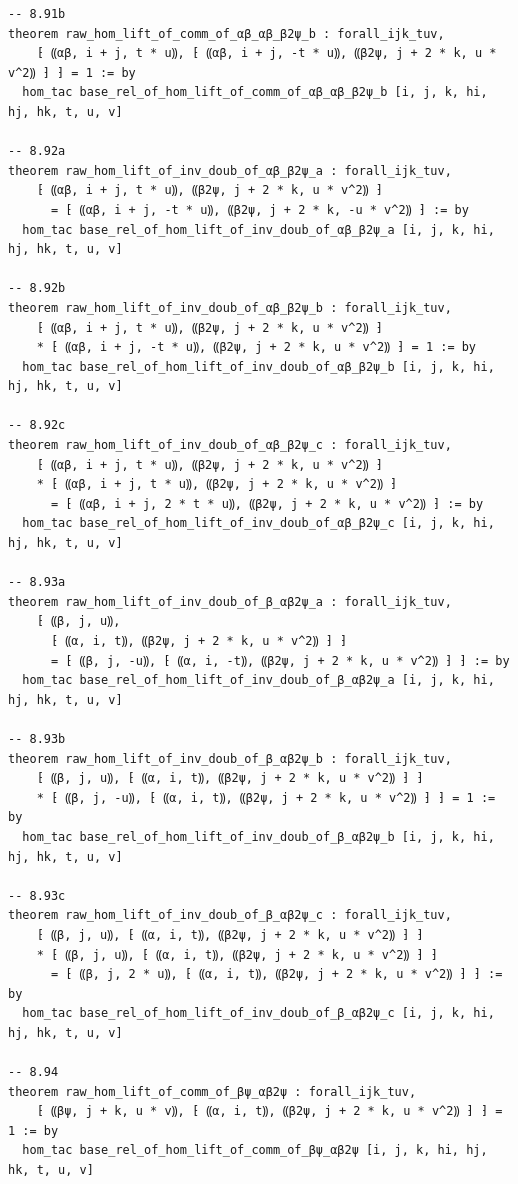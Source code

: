 \documentclass[10pt,a4paper]{article}
\begin{document}
\begin{Verbatim}
-- 8.91b
theorem raw_hom_lift_of_comm_of_αβ_αβ_β2ψ_b : forall_ijk_tuv,
    ⁅ ⸨αβ, i + j, t * u⸩, ⁅ ⸨αβ, i + j, -t * u⸩, ⸨β2ψ, j + 2 * k, u * v^2⸩ ⁆ ⁆ = 1 := by
  hom_tac base_rel_of_hom_lift_of_comm_of_αβ_αβ_β2ψ_b [i, j, k, hi, hj, hk, t, u, v]

-- 8.92a
theorem raw_hom_lift_of_inv_doub_of_αβ_β2ψ_a : forall_ijk_tuv,
    ⁅ ⸨αβ, i + j, t * u⸩, ⸨β2ψ, j + 2 * k, u * v^2⸩ ⁆
      = ⁅ ⸨αβ, i + j, -t * u⸩, ⸨β2ψ, j + 2 * k, -u * v^2⸩ ⁆ := by
  hom_tac base_rel_of_hom_lift_of_inv_doub_of_αβ_β2ψ_a [i, j, k, hi, hj, hk, t, u, v]

-- 8.92b
theorem raw_hom_lift_of_inv_doub_of_αβ_β2ψ_b : forall_ijk_tuv,
    ⁅ ⸨αβ, i + j, t * u⸩, ⸨β2ψ, j + 2 * k, u * v^2⸩ ⁆
    * ⁅ ⸨αβ, i + j, -t * u⸩, ⸨β2ψ, j + 2 * k, u * v^2⸩ ⁆ = 1 := by
  hom_tac base_rel_of_hom_lift_of_inv_doub_of_αβ_β2ψ_b [i, j, k, hi, hj, hk, t, u, v]

-- 8.92c
theorem raw_hom_lift_of_inv_doub_of_αβ_β2ψ_c : forall_ijk_tuv,
    ⁅ ⸨αβ, i + j, t * u⸩, ⸨β2ψ, j + 2 * k, u * v^2⸩ ⁆
    * ⁅ ⸨αβ, i + j, t * u⸩, ⸨β2ψ, j + 2 * k, u * v^2⸩ ⁆
      = ⁅ ⸨αβ, i + j, 2 * t * u⸩, ⸨β2ψ, j + 2 * k, u * v^2⸩ ⁆ := by
  hom_tac base_rel_of_hom_lift_of_inv_doub_of_αβ_β2ψ_c [i, j, k, hi, hj, hk, t, u, v]

-- 8.93a
theorem raw_hom_lift_of_inv_doub_of_β_αβ2ψ_a : forall_ijk_tuv,
    ⁅ ⸨β, j, u⸩,
      ⁅ ⸨α, i, t⸩, ⸨β2ψ, j + 2 * k, u * v^2⸩ ⁆ ⁆
      = ⁅ ⸨β, j, -u⸩, ⁅ ⸨α, i, -t⸩, ⸨β2ψ, j + 2 * k, u * v^2⸩ ⁆ ⁆ := by
  hom_tac base_rel_of_hom_lift_of_inv_doub_of_β_αβ2ψ_a [i, j, k, hi, hj, hk, t, u, v]

-- 8.93b
theorem raw_hom_lift_of_inv_doub_of_β_αβ2ψ_b : forall_ijk_tuv,
    ⁅ ⸨β, j, u⸩, ⁅ ⸨α, i, t⸩, ⸨β2ψ, j + 2 * k, u * v^2⸩ ⁆ ⁆
    * ⁅ ⸨β, j, -u⸩, ⁅ ⸨α, i, t⸩, ⸨β2ψ, j + 2 * k, u * v^2⸩ ⁆ ⁆ = 1 := by
  hom_tac base_rel_of_hom_lift_of_inv_doub_of_β_αβ2ψ_b [i, j, k, hi, hj, hk, t, u, v]

-- 8.93c
theorem raw_hom_lift_of_inv_doub_of_β_αβ2ψ_c : forall_ijk_tuv,
    ⁅ ⸨β, j, u⸩, ⁅ ⸨α, i, t⸩, ⸨β2ψ, j + 2 * k, u * v^2⸩ ⁆ ⁆
    * ⁅ ⸨β, j, u⸩, ⁅ ⸨α, i, t⸩, ⸨β2ψ, j + 2 * k, u * v^2⸩ ⁆ ⁆
      = ⁅ ⸨β, j, 2 * u⸩, ⁅ ⸨α, i, t⸩, ⸨β2ψ, j + 2 * k, u * v^2⸩ ⁆ ⁆ := by
  hom_tac base_rel_of_hom_lift_of_inv_doub_of_β_αβ2ψ_c [i, j, k, hi, hj, hk, t, u, v]

-- 8.94
theorem raw_hom_lift_of_comm_of_βψ_αβ2ψ : forall_ijk_tuv,
    ⁅ ⸨βψ, j + k, u * v⸩, ⁅ ⸨α, i, t⸩, ⸨β2ψ, j + 2 * k, u * v^2⸩ ⁆ ⁆ = 1 := by
  hom_tac base_rel_of_hom_lift_of_comm_of_βψ_αβ2ψ [i, j, k, hi, hj, hk, t, u, v]


\end{Verbatim}
\end{document}
